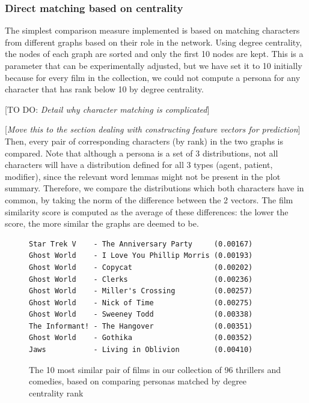 \documentclass[bsc,frontabs,singlespacing,parskip]{infthesis} %
\begin{document}
\subsubsection{Direct matching based on centrality}
The simplest comparison measure implemented is based on matching characters from different graphs based on their role in the network. Using degree centrality, the nodes of each graph are sorted and only the first 10 nodes are kept. This is a parameter that can be experimentally adjusted, but we have set it to 10 initially because for every film in the collection, we could not compute a persona for any character that has rank below 10 by degree centrality.

[TO DO: \textit{Detail why character matching is complicated}]

[\textit{Move this to the section dealing with constructing feature vectors for prediction}] Then, every pair of corresponding characters (by rank) in the two graphs is compared. Note that although a persona is a set of 3 distributions, not all characters will have a distribution defined for all 3 types (agent, patient, modifier), since the relevant word lemmas might not be present in the plot summary. Therefore, we compare the distributions which both characters have in common, by taking the norm of the difference between the 2 vectors. The film similarity score is computed as the average of these differences: the lower the score, the more similar the graphs are deemed to be.

\begin{figure}[h]
\centering
\begin{minipage}{11.5cm}
\begin{Verbatim}[frame=single]
Star Trek V    - The Anniversary Party     (0.00167)
Ghost World    - I Love You Phillip Morris (0.00193)
Ghost World    - Copycat                   (0.00202)
Ghost World    - Clerks                    (0.00236)
Ghost World    - Miller's Crossing         (0.00257)
Ghost World    - Nick of Time              (0.00275)
Ghost World    - Sweeney Todd              (0.00338)
The Informant! - The Hangover              (0.00351)
Ghost World    - Gothika                   (0.00352)
Jaws           - Living in Oblivion        (0.00410)
\end{Verbatim}
\end{minipage}
\caption{The 10 most similar pair of films in our collection of 96 thrillers and comedies, based on comparing personas matched by degree centrality rank}
\end{figure}
\end{document}
